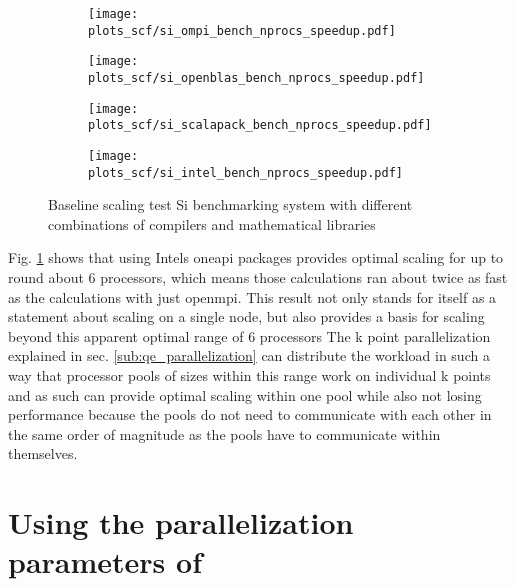 \documentclass[main.tex]{subfiles}
\begin{document}
\begin{figure}[ht!]
\begin{subfigure}[b]{0.49\textwidth}
    \centering
    \texttt{[image: plots\_scf/si\_ompi\_bench\_nprocs\_speedup.pdf]}
\end{subfigure}
\begin{subfigure}[b]{0.49\textwidth}
    \centering
    \texttt{[image: plots\_scf/si\_openblas\_bench\_nprocs\_speedup.pdf]}
\end{subfigure}
\begin{subfigure}[b]{0.49\textwidth}
    \centering
    \texttt{[image: plots\_scf/si\_scalapack\_bench\_nprocs\_speedup.pdf]}
\end{subfigure}
\begin{subfigure}[b]{0.49\textwidth}
    \centering
    \texttt{[image: plots\_scf/si\_intel\_bench\_nprocs\_speedup.pdf]}
\end{subfigure}
\caption{Baseline scaling test Si benchmarking system with different combinations of compilers and mathematical libraries}
\label{fig:scaling_compilers_nprocs}
\end{figure}


Fig. \ref{fig:scaling_compilers_nprocs} shows that using Intels \gls{oneapi} packages provides optimal scaling for up to round about 6 processors, which means those calculations ran about twice as fast as the calculations with just \gls{openmpi}.
This result not only stands for itself as a statement about scaling on a single node, but also provides a basis for scaling beyond this apparent optimal range of 6 processors
The k point parallelization explained in sec. \ref{sub:qe_parallelization} can distribute the workload in such a way that processor pools of sizes within this range work on individual k points and as such can provide optimal scaling within one pool while also not losing performance because the pools do not need to communicate with each other in the same order of magnitude as the pools have to communicate within themselves.


\section{Using the parallelization parameters of \QE}
\end{document}

